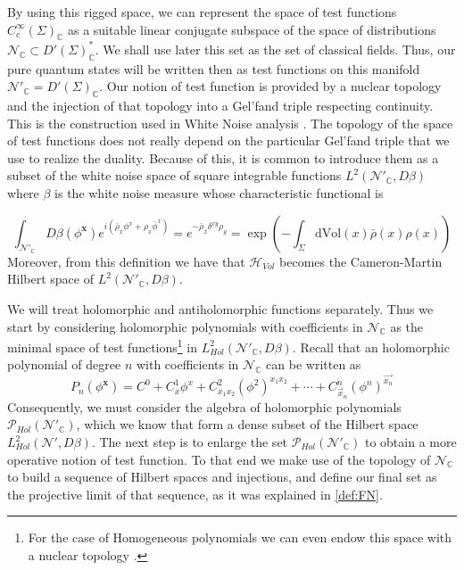 \documentclass{elsarticle}%
\begin{document}
By using this rigged space, we can represent the space of test functions $C^\infty_c(\Sigma)_{\mathbb{C}}$ as a suitable linear conjugate subspace of the space of distributions $\mathcal{N}_{\mathbb{C}}\subset D'(\Sigma)_{\mathbb{C}}^*$. We shall use later this set as the set of classical fields.  Thus, our pure quantum states will be written then as test functions on this manifold $\mathcal{N}'_{\mathbb{C}}=D'(\Sigma)_{\mathbb{C}}$. Our notion of test function is provided by a nuclear topology and the injection of that topology into a Gel'fand triple respecting continuity.  This is the construction used in White Noise analysis \cite{hidaWhiteNoise1993,holdenStochasticPartial2010,westerkampRecentResults2003}. The topology of the space of test functions does not really depend on the particular Gel'fand triple that we use to realize the duality.  Because of this, it is common to introduce them as a subset of the white noise space of square integrable functions $L^2(\mathcal{N}'_{\mathbb{C}},D\beta)$ where $\beta$ is the white noise measure whose characteristic functional is

\begin{equation}
\label{eq:whiteNoise}
\int_{\mathcal{N}'_{\mathbb{C}}}D\beta(\phi^\mathbf{x}) e^{i(\bar\rho_x\phi^x+\rho_x\bar\phi^x)}= e^{-\bar\rho_x\delta^{xy}\rho_y}=\exp\left(-\int_\Sigma \textrm{dVol}(x)\bar\rho(x)\rho(x)\right)
\end{equation}
Moreover, from this definition we have that $\mathcal{H}_{Vol}$ becomes the Cameron-Martin Hilbert space of $L^2(\mathcal{N}'_{\mathbb{C}},D\beta)$.


We will treat holomorphic and antiholomorphic functions separately. Thus we start by considering  holomorphic polynomials with coefficients in  $\mathcal{N}_{\mathbb{C}}$ as the minimal space of test functions\footnote{For the case of Homogeneous polynomials we can even endow this space with a nuclear topology \cite{dineenComplexAnalysis1981}.} in $L^2_{Hol}(\mathcal{N}'_{\mathbb{C}},D\beta)$. Recall that an holomorphic polynomial of degree $n$ with coefficients in $\mathcal{N}_{\mathbb{C}}$ can be written as
\begin{equation}
\label{eq:polynomials} 
P_n(\phi^{\mathbf{x}})= C^0+C^1_x\phi^x+C^{2}_{x_1x_2}(\phi^2)^{x_1x_2}+\cdots+C^n_{\vec{x}_n}(\phi^n)^{\vec{x_n}}
\end{equation}    
Consequently, we must consider  the algebra of holomorphic polynomials $\mathcal{P}_{Hol}(\mathcal{N}'_{\mathbb{C}})$, which we know that  form a dense subset of the Hilbert space $L^2_{Hol}(\mathcal{N}', D\beta)$. The next step is to enlarge the set $\mathcal{P}_{Hol}(\mathcal{N}'_{\mathbb{C}})$ to obtain a more operative notion of test function.   To that end we make use of the topology of $\mathcal{N}_{\mathbb{C}}$ to build a sequence of Hilbert spaces and injections, and define our final set as the projective limit of that sequence, as it was explained in \autoref{def:FN}.
\end{document}
